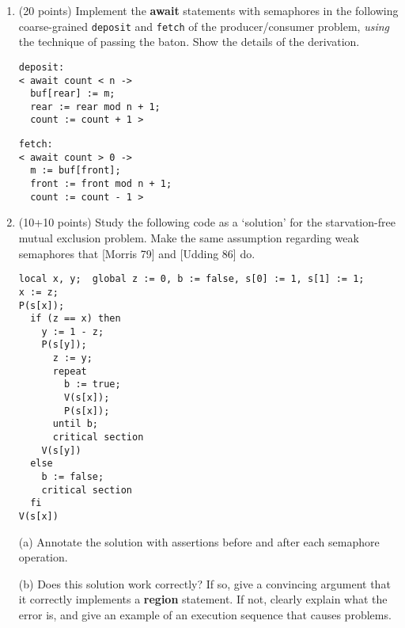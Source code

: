 \begin{enumerate}
\item (20 points)
Implement the {\bf await} statements with semaphores in the following
coarse-grained {\tt deposit} and {\tt fetch} of the producer/consumer
problem, {\em using} the technique of passing the baton.  Show the
details of the derivation.

\begin{minipage}{2.5in}
\begin{verbatim}
deposit:
< await count < n ->
  buf[rear] := m;
  rear := rear mod n + 1;
  count := count + 1 >
\end{verbatim}
\end{minipage}
\begin{minipage}{2in}
\begin{verbatim}
fetch:
< await count > 0 ->
  m := buf[front];
  front := front mod n + 1;
  count := count - 1 >
\end{verbatim}
\end{minipage}

\item (10+10 points)
Study the following code as a `solution' for the starvation-free
mutual exclusion problem.  Make the same assumption regarding weak
semaphores that [Morris 79] and [Udding 86] do.

\begin{verbatim}
local x, y;  global z := 0, b := false, s[0] := 1, s[1] := 1;
x := z;
P(s[x]);
  if (z == x) then
    y := 1 - z;
    P(s[y]);
      z := y;
      repeat
        b := true;
        V(s[x]);
        P(s[x]);
      until b;
      critical section
    V(s[y])
  else
    b := false;
    critical section
  fi
V(s[x])
\end{verbatim}

(a) Annotate the solution with assertions
before and after each semaphore operation.\par

(b) Does this solution work correctly?  If so, give a
convincing argument that it correctly implements a {\bf region}
statement.  If not, clearly explain what the error is, and give an
example of an execution sequence that causes problems.

\end{enumerate}

